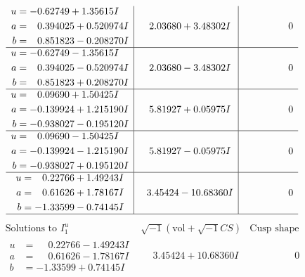 \documentclass[1p]{elsarticle_modified}
\theoremstyle{definition}
\newcommand{\I}{\sqrt{-1}}
\begin{document}
$$\begin{array}{c|c|c}
\begin{aligned}
u &= -0.62749 + 1.35615 I \\
a &= \phantom{-}0.394025 + 0.520974 I \\
b &= \phantom{-}0.851823 - 0.208270 I\end{aligned}
 & \phantom{-}2.03680 + 3.48302 I & \phantom{-0.000000 } 0 \\ \hline\begin{aligned}
u &= -0.62749 - 1.35615 I \\
a &= \phantom{-}0.394025 - 0.520974 I \\
b &= \phantom{-}0.851823 + 0.208270 I\end{aligned}
 & \phantom{-}2.03680 - 3.48302 I & \phantom{-0.000000 } 0 \\ \hline\begin{aligned}
u &= \phantom{-}0.09690 + 1.50425 I \\
a &= -0.139924 + 1.215190 I \\
b &= -0.938027 - 0.195120 I\end{aligned}
 & \phantom{-}5.81927 + 0.05975 I & \phantom{-0.000000 } 0 \\ \hline\begin{aligned}
u &= \phantom{-}0.09690 - 1.50425 I \\
a &= -0.139924 - 1.215190 I \\
b &= -0.938027 + 0.195120 I\end{aligned}
 & \phantom{-}5.81927 - 0.05975 I & \phantom{-0.000000 } 0 \\ \hline\begin{aligned}
u &= \phantom{-}0.22766 + 1.49243 I \\
a &= \phantom{-}0.61626 + 1.78167 I \\
b &= -1.33599 - 0.74145 I\end{aligned}
 & \phantom{-}3.45424 - 10.68360 I & \phantom{-0.000000 } 0\\
 \hline 
 \end{array}$$\newpage$$\begin{array}{c|c|c}  
\text{Solutions to }I^u_{1}& \I (\text{vol} + \sqrt{-1}CS) & \text{Cusp shape}\\
 \hline 
\begin{aligned}
u &= \phantom{-}0.22766 - 1.49243 I \\
a &= \phantom{-}0.61626 - 1.78167 I \\
b &= -1.33599 + 0.74145 I\end{aligned}
 & \phantom{-}3.45424 + 10.68360 I & \phantom{-0.000000 } 0 \\ \hline\begin{aligned}

\end{aligned}
\end{array}$$
\end{document}
